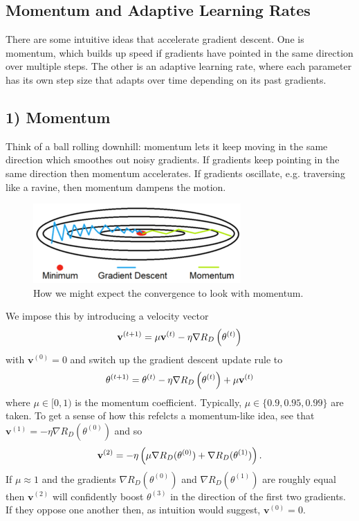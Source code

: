 \documentclass[11pt]{article}
\begin{document}
\subsection{Momentum and Adaptive Learning Rates}
There are some intuitive ideas that accelerate gradient descent. One is momentum, which builds up speed if gradients have pointed in the same direction over multiple steps. The other is an adaptive learning rate, where each parameter has its own step size that adapts over time depending on its past gradients.

\subsection*{1) Momentum}
Think of a ball rolling downhill: momentum lets it keep moving in the same direction which smoothes out noisy gradients. If gradients keep pointing in the same direction then momentum accelerates. If gradients oscillate, e.g. traversing like a ravine, then momentum dampens the motion.

\begin{figure}[ht]
    \centering
    \includegraphics[width=\columnwidth]{./figures/gradient_descent/momentum.png}
    \caption{How we might expect the convergence to look with momentum.}
    \label{fig:gradient_descent_momentum}
\end{figure}

We impose this by introducing a velocity vector
$$
\mathbf{v}^{(t+1)}=\mu\mathbf{v}^{(t)}-\eta\nabla R_D\left(\theta^{(t)}\right)
$$
with $\mathbf{v}^{(0)}=0$ and switch up the gradient descent update rule to
$$
\theta^{(t+1)}
=
\theta^{(t)}-\eta\nabla R_D\left(\theta^{(t)}\right)+\mu\mathbf{v}^{(t)}
$$
where $\mu\in[0,1)$ is the momentum coefficient. Typically, $\mu\in\{0.9,0.95,0.99\}$ are taken. To get a sense of how this refelcts a momentum-like idea, see that $\mathbf{v}^{(1)}=-\eta\nabla R_D(\theta^{(0)})$ and so
$$
\mathbf{v}^{(2)}
=
-\eta\left(\mu\nabla R_D(\theta^{(0)})+\nabla R_D(\theta^{(1)})\right).
$$
If $\mu\approx1$ and the gradients $\nabla R_D(\theta^{(0)})$ and $\nabla R_D(\theta^{(1)})$ are roughly equal then $\mathbf{v}^{(2)}$ will confidently boost $\theta^{(3)}$ in the direction of the first two gradients. If they oppose one another then, as intuition would suggest, $\mathbf{v}^{(0)}=0$.
\end{document}
